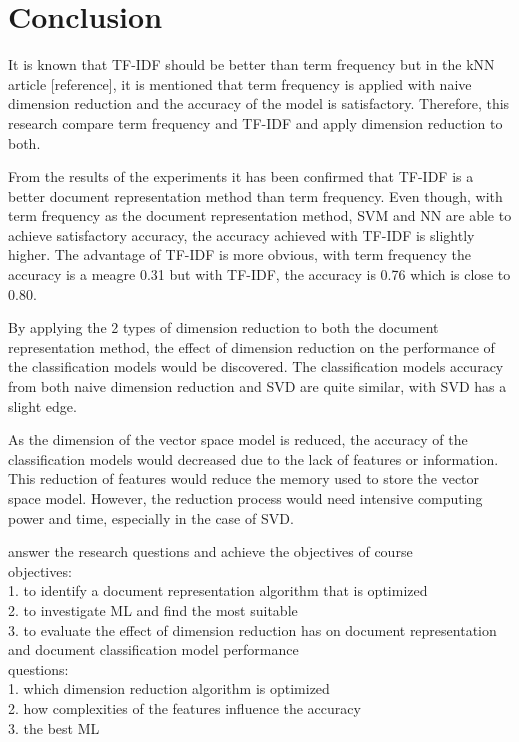 \chapter{Conclusion}
It is known that TF-IDF should be better than term frequency but in the kNN article [reference], it is mentioned that term frequency is applied with naive dimension reduction and the accuracy of the model is satisfactory. Therefore, this research compare term frequency and TF-IDF and apply dimension reduction to both.

From the results of the experiments it has been confirmed that TF-IDF is a better document representation method than term frequency. Even though, with term frequency as the document representation method, SVM and NN are able to achieve satisfactory accuracy, the accuracy achieved with TF-IDF is slightly higher. The advantage of TF-IDF is more obvious, with term frequency the accuracy is a meagre 0.31 but with TF-IDF, the accuracy is 0.76 which is close to 0.80.

By applying the 2 types of dimension reduction to both the document representation method, the effect of dimension reduction on the performance of the classification models would be discovered. The classification models accuracy from both naive dimension reduction and SVD are quite similar, with SVD has a slight edge.

As the dimension of the vector space model is reduced, the accuracy of the classification models would decreased due to the lack of features or information. This reduction of features would reduce the memory used to store the vector space model. However, the reduction process would need intensive computing power and time, especially in the case of SVD.



answer the research questions and achieve the objectives of course\\

objectives:\\
1. to identify a document representation algorithm that is optimized\\
2. to investigate ML and find the most suitable\\
3. to evaluate the effect of dimension reduction has on document representation and document classification model performance\\

questions:\\
1. which dimension reduction algorithm is optimized\\
2. how complexities of the features influence the accuracy\\
3. the best ML\\